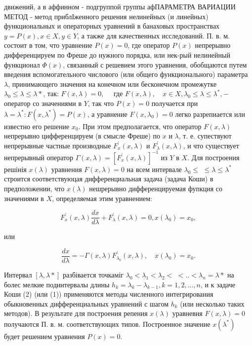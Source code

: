 \documentclass[10pt]{article}
\begin{document}
движений, а в аффинном - подгруппой группы афПАРАМЕТРА ВАРИАЦИИ МЕТОД - метод приблІженного решения нелинейных (и линейных) функциональных и операторных уравнений в банаховых пространствах $y=P(x), x \in X, y \in Y$, а также для качественных исследований. П. в. м. состоит в том, что уравнение $P(x)=0$, где оператор $P(x)$ непрерывно дифференцируем по Фреше до нужного порядка, или нек-рый нелинейный функционал $\Phi(x)$, связанный с решевием этого уравнения, обобщаются путем введения вспомогательного числового (или общего функционального) параметра $\lambda$, принимающего значения на конечном или бесконечном промежутке $\lambda_{0} \leqslant \lambda \leqslant \lambda *$, так: $F(x, \lambda)=0, \quad$ где $F(x, \lambda), \quad x \in X, \lambda_{0} \leqslant \lambda \leqslant \lambda^{*},-$ оператор со значениями в $Y$, так что $P(x)=0$ получается при $\lambda=\lambda^{*}: F\left(x, \lambda^{*}\right)=P(x)$, а уравнение $F\left(x, \lambda_{0}\right)=0$ легко разрепиается или известно его решение $x_{0}$. При этом предполагается, что оператор $F(x, \lambda)$ непрерывно цифференцируем (в смысле Фреше) по $x$ и $\lambda$, т. е. супествуют непрерывные частные производные $F_{x}^{\prime}(x, \lambda)$ и $F_{\lambda}^{\prime}(x, \lambda)$, и что существует непрерывный оператор $\Gamma(x, \lambda)=\left[F_{x}^{\prime}(x, \lambda)\right]^{-1}$ из $Y$ в $X$. Для построения решінія $x(\lambda)$ уравнения $F(x, \lambda)=0$ на всем интервале $\lambda_{0} \leqslant$ $\leqslant \lambda \leqslant \lambda^{*}$ строится соответствуюцая дифференциальная задача (задача Коши) в предположении, что $x(\lambda)$ нешрерывно дифференцируемая фупкция со значениями в $X$, определяемая этим уравнением:

\[
F_{x}^{\prime}(x, \lambda) \frac{d x}{d \lambda}+F_{\lambda}^{\prime}(x, \lambda)=0, x\left(\lambda_{0}\right)=x_{0},
\]

или

\[
\frac{d x}{d \lambda}=-\Gamma(x, \lambda) F_{\lambda_{0}}^{\prime}(x, \lambda), \quad x\left(\lambda_{0}\right)=x_{0} .
\]

Интервал $[\lambda, \lambda *]$ разбівается точкаміг $\lambda_{0}<\lambda_{1}<\lambda_{2}<$ $<. .<\lambda_{n}=\lambda *$ на болес мелкие подинтервалы длины $h_{k}=\lambda_{k}-\lambda_{k-1}, k=1,2, \ldots, n$, и к задаче Коши (2) (или (1)) применяются методы численного интегрирования обыкновенных дифференциальных уравнений с шагом $h_{k}$ (или несколько таких методов). В результате для построения репения $x(\lambda)$ уравневия $F(x, \lambda)=0$ получаются П. в. м. соответствующих типов. Построенное значение $x\left(\lambda^{*}\right)$ будет решением уравнения $P(x)=0$.
\end{document}
